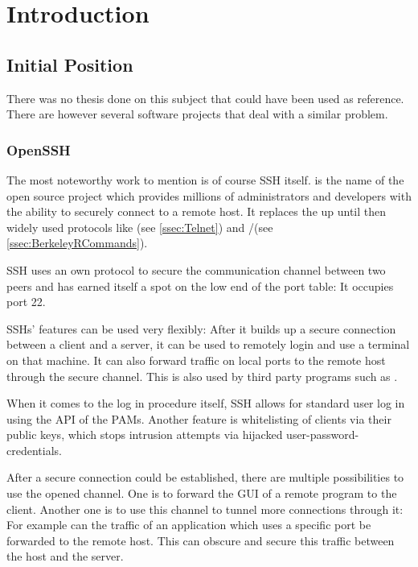 \documentclass[10pt,a4paper,titlepage,twoside,english,final]{zhawreprt}
\begin{document}
\makedeclarationoforiginality

\tableofcontents

\chapter{Introduction}\label{chp:Introduction}
\section{Initial Position}\label{sec:InitialPosition}
There was no thesis done on this subject that could have been used as reference.
There are however several software projects that deal with a similar problem.

\subsection{OpenSSH}\label{ssec:OpenSSH}
The most noteworthy work to mention is of course \gls{SSH} itself.
\cite{openssh} is the name of the open source project which provides millions of administrators and developers with the ability to securely connect to a remote host.
It replaces the up until then widely used protocols like \cite{telnet}(see \ref{ssec:Telnet}) and \cite{rlogin}/\cite{rsh}(see \ref{ssec:BerkeleyRCommands}).

\gls{SSH} uses an own protocol to secure the communication channel between two peers and has earned itself a spot on the low end of the \gls{port} table: It occupies \gls{port} 22.

\gls{SSH}s' features can be used very flexibly: After it builds up a secure connection between a client and a server, it can be used to remotely login and use a \gls{terminal} on that machine.
It can also forward traffic on local ports to the remote host through the secure channel.
This is also used by third party programs such as \cite{rsync}.

When it comes to the log in procedure itself, \gls{SSH} allows for standard user log in using the \gls{API} of the \glspl{PAM}.
Another feature is whitelisting of clients via their public keys, which stops intrusion attempts via hijacked user-password-credentials.

After a secure connection could be established, there are multiple possibilities to use the opened channel.
One is to forward the \gls{GUI} of a remote program to the client.
Another one is to use this channel to tunnel more connections through it: For example can the traffic of an application which uses a specific \gls{port} be forwarded to the remote host.
This can obscure and secure this traffic between the host and the server.
\end{document}
